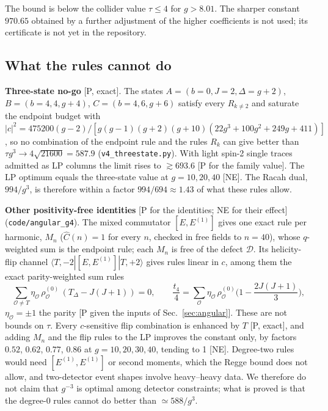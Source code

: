 \noindent The bound is below the collider value $\tau\le4$ for $g>8.01$. The sharper constant $970.65$ obtained by a further adjustment of the
higher coefficients is not used; its certificate is not yet in the repository.

\subsection{What the rules cannot do}
\label{sec:allk-nogo}
\textbf{Three-state no-go} [P, exact]. The states $A=(b{=}0,J{=}2,\Delta{=}g{+}2)$, $B=(b{=}4,4,g{+}4)$, $C=(b{=}4,6,g{+}6)$ satisfy every $R_{k\ne2}$ and saturate
the endpoint budget with
$|c|^2=475200(g-2)/[g(g-1)(g+2)(g+10)(22g^3+100g^2+249g+411)]$, so no combination of the endpoint rule and the rules $R_k$ can give
better than $\tau g^3\to4\sqrt{21600}=587.9$ (\texttt{v4\_threestate.py}). With light spin-2 single traces admitted as LP columns the
limit rises to $\gtrsim693.6$ [P for the family value]. The LP optimum equals the three-state value at $g=10,20,40$ [NE]. The Racah dual,
$994/g^3$, is therefore within a factor $994/694\approx1.43$ of what these rules allow.

\textbf{Other positivity-free identities} [P for the identities; NE for their effect] (\texttt{code/angular\_g4}). The mixed commutator
$[E,E^{(1)}]$ gives one exact rule per harmonic, $M_n$ ($\hat C(n)=1$ for every $n$, checked in free fields to $n=40$), whose $q$-weighted sum is
the endpoint rule; each $M_n$ is free of the defect $\mathcal D$. Its helicity-flip channel $\langle T,-2|[E,E^{(1)}]|T,+2\rangle$ gives rules
linear in $c$, among them the exact parity-weighted sum rules
\begin{equation}
\sum_{\mathcal O\ne T}\eta_{\mathcal O}\,\rho^{(0)}_{\mathcal O}\,(T_\Delta-J(J+1))=0,\qquad
\frac{t_4}4=\sum_{\mathcal O}\eta_{\mathcal O}\,\rho^{(0)}_{\mathcal O}\Big(1-\frac{2J(J+1)}3\Big),
\label{eq:allk-parity}
\end{equation}
$\eta_{\mathcal O}=\pm1$ the parity [P given the inputs of Sec.~\ref{sec:angular}]. These are not bounds on $\tau$. Every $c$-sensitive flip
combination is enhanced by $T$ [P, exact], and adding $M_n$ and the flip rules to the LP improves the constant only, by factors $0.52$,
$0.62$, $0.77$, $0.86$ at $g=10,20,30,40$, tending to 1 [NE]. Degree-two rules would need $[E^{(1)},E^{(1)}]$ or second moments, which the
Regge bound does not allow, and two-detector event shapes involve heavy--heavy data. We therefore do not claim that $g^{-3}$ is optimal
among detector constraints; what is proved is that the degree-0 rules cannot do better than $\simeq588/g^3$.

